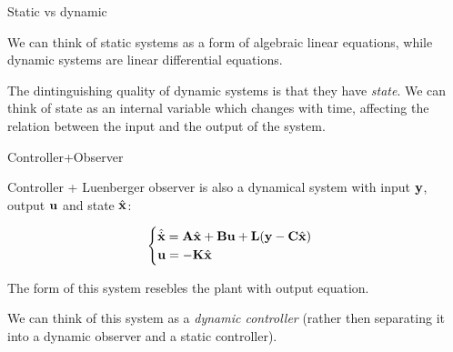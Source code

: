 \documentclass{beamer}
\begin{document}
\begin{frame}{Static vs dynamic}
	\begin{flushleft}
		
		We can think of static systems as a form of algebraic linear equations, while dynamic systems are linear differential equations.
		
		\bigskip
		
		The dintinguishing quality of dynamic systems is that they have \emph{state}. We can think of state as an internal variable which changes with time, affecting the relation between the input and the output of the system.
		
	\end{flushleft}
\end{frame}



\begin{frame}{Controller+Observer}
	\begin{flushleft}
		
		Controller + Luenberger observer is also a dynamical system with input $\mathbf{y}$, output $\mathbf{u}$ and state $\hat{\mathbf{x}}$:
		
		\begin{equation}
			\begin{cases}
				\hat{\dot {\mathbf{x}}} = \mathbf{A} \hat{\mathbf{x}} + \mathbf{B} \mathbf u + \mathbf{L}(\mathbf y - \mathbf{C} \hat{\mathbf{x}})
				\\
				\mathbf{u} = -\mathbf{K} \hat{\mathbf{x}}
			\end{cases}
		\end{equation}
		
		The form of this system resebles the plant with output equation.
		
		\bigskip
		
		We can think of this system as a \emph{dynamic controller} (rather then separating it into a dynamic observer and a static controller). 
		
	\end{flushleft}
\end{frame}
\end{document}
